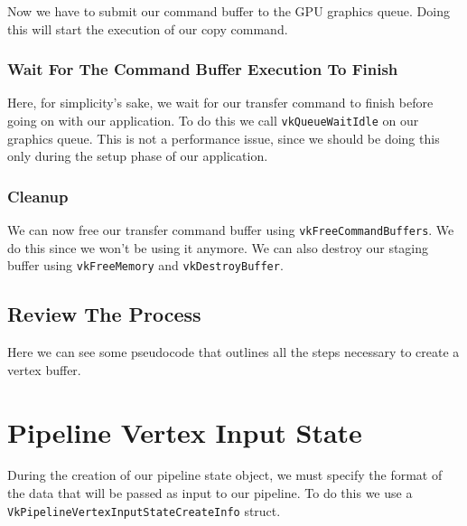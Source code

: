 Now we have to submit our command buffer to the GPU graphics queue.
Doing this will start the execution of our copy command.

\begin{minipage}{\linewidth}{\noindent}
    
\end{minipage}

\subsubsection{Wait For The Command Buffer Execution To Finish}

Here, for simplicity's sake, we wait for our transfer command to finish
before going on with our application.
To do this we call \texttt{vkQueueWaitIdle} on our graphics queue.
This is not a performance issue, since we should be doing this
only during the setup phase of our application.

\subsubsection{Cleanup}

We can now free our transfer command buffer using \texttt{vkFreeCommandBuffers}.
We do this since we won't be using it anymore.
We can also destroy our staging buffer using \texttt{vkFreeMemory}
and \texttt{vkDestroyBuffer}.

\subsection{Review The Process}

Here we can see some pseudocode that outlines all the steps necessary to
create a vertex buffer.

\begin{minipage}{\linewidth}{\noindent}
    
\end{minipage}

\section{Pipeline Vertex Input State}

During the creation of our pipeline state object, we must specify
the format of the data that will be passed as input to our pipeline.
To do this we use a \texttt{VkPipelineVertexInputStateCreateInfo} struct.

